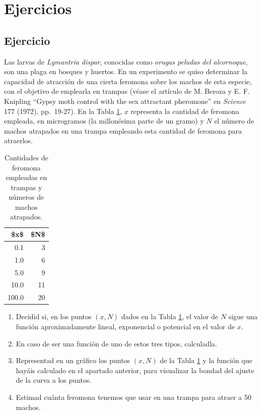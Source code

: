 \documentclass[
]{book}
\theoremstyle{definition}
\theoremstyle{definition}
\theoremstyle{definition}
\theoremstyle{remark}
\begin{document}
\hypertarget{ejercicios-1}{%
\section{Ejercicios}\label{ejercicios-1}}

\hypertarget{ejercicio-1}{%
\subsection*{Ejercicio}\label{ejercicio-1}}

Las larvas de \emph{Lymantria dispar}, conocidas como \emph{orugas peludas del alcornoque}, son una plaga en bosques y huertos. En un experimento se quiso determinar la capacidad de atracción de una cierta feromona sobre los machos de esta especie, con el objetivo de emplearla en trampas (véase el artículo de M. Beroza y E. F. Knipling ``Gypsy moth control with the sex attractant pheromone'' en \emph{Science} 177 (1972), pp.~19-27).
En la Tabla \ref{tab:cuques}, \(x\) representa la cantidad de feromona empleada, en microgramos (la millonésima parte de un gramo) y \(N\) el número de machos atrapados en una trampa empleando esta cantidad de feromona para atraerlos.

\begin{table}

\caption{\label{tab:cuques}Cantidades de feromona empleadas en trampas y números de machos atrapados.}
\centering
\begin{tabular}[t]{r|r}
\hline
\$x\$ & \$N\$\\
\hline
0.1 & 3\\
\hline
1.0 & 6\\
\hline
5.0 & 9\\
\hline
10.0 & 11\\
\hline
100.0 & 20\\
\hline
\end{tabular}
\end{table}

\begin{enumerate}
\def\labelenumi{\arabic{enumi}.}
\item
  Decidid si, en los puntos \((x,N)\) dados en la Tabla \ref{tab:cuques}, el valor de \(N\) sigue una función aproximadamente lineal, exponencial o potencial en el valor de \(x\).
\item
  En caso de ser una función de uno de estos tres tipos, calculadla.
\item
  Representad en un gráfico los puntos \((x,N)\) de la Tabla \ref{tab:cuques} y la función que hayáis calculado en el apartado anterior, para visualizar la bondad del ajuste de la curva a los puntos.
\item
  Estimad cuánta feromona tenemos que usar en una trampa para atraer a 50 machos.
\end{enumerate}
\end{document}
